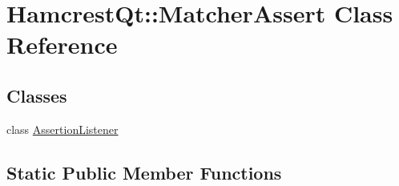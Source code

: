 \hypertarget{class_hamcrest_qt_1_1_matcher_assert}{\section{Hamcrest\-Qt\-:\-:Matcher\-Assert Class Reference}
\label{class_hamcrest_qt_1_1_matcher_assert}
}
\subsection*{Classes}
\begin{DoxyCompactItemize}
\item 
class \hyperlink{class_hamcrest_qt_1_1_matcher_assert_1_1_assertion_listener}{Assertion\-Listener}
\end{DoxyCompactItemize}
\subsection*{Static Public Member Functions}
